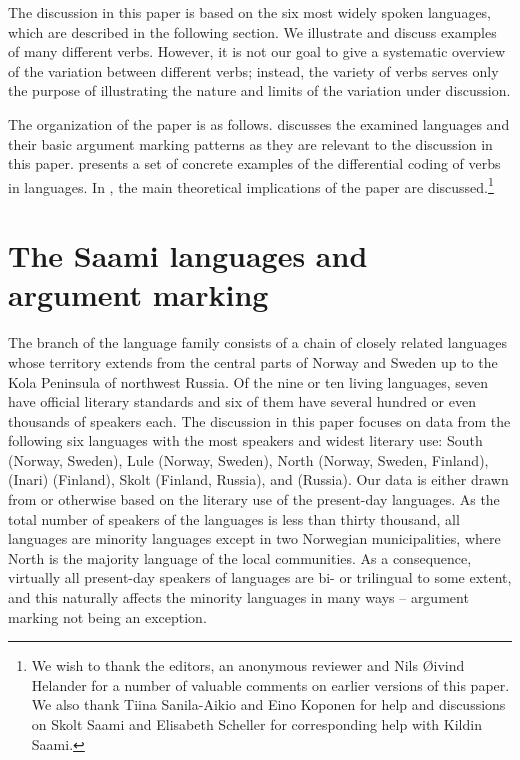 \documentclass[output=paper]{LSP/langsci}
\begin{document}
The discussion in this paper is based on the six most widely spoken  languages, which are described in the following section. We illustrate and discuss examples of many different  verbs. However, it is not our goal to give a systematic overview of the variation between different verbs; instead, the variety of verbs serves only the purpose of illustrating the nature and limits of the variation under discussion.

 The organization of the paper is as follows.  discusses the examined  languages and their basic argument marking patterns as they are relevant to the discussion in this paper.  presents a set of concrete examples of the differential coding of  verbs in  languages. In , the main theoretical implications of the paper are discussed.\footnote{We wish to thank the editors, an anonymous reviewer and Nils Øivind Helander for a number of valuable comments on earlier versions of this paper. We also thank Tiina Sanila-Aikio and Eino Koponen for help and discussions on Skolt Saami and Elisabeth Scheller for corresponding help with Kildin Saami.}

\section{The Saami languages and argument marking}
\label{16-sec:2}

The  branch of the  language family consists of a chain of closely related languages whose territory extends from the central parts of Norway and Sweden up to the Kola Peninsula of northwest Russia. Of the nine or ten living  languages, seven have official literary standards and six of them have several hundred or even thousands of speakers each. The discussion in this paper focuses on data from the following six languages with the most speakers and widest literary use: South  (Norway, Sweden), Lule  (Norway, Sweden), North  (Norway, Sweden, Finland),  (Inari)  (Finland), Skolt  (Finland, Russia), and  (Russia). Our data is either drawn from or otherwise based on the literary use of the present-day languages. As the total number of speakers of the  languages is less than thirty thousand, all  languages are minority languages except in two Norwegian municipalities, where North  is the majority language of the local communities. As a consequence, virtually all present-day speakers of  languages are bi- or trilingual to some extent, and this naturally affects the minority languages in many ways – argument marking not being an exception.
\end{document}

